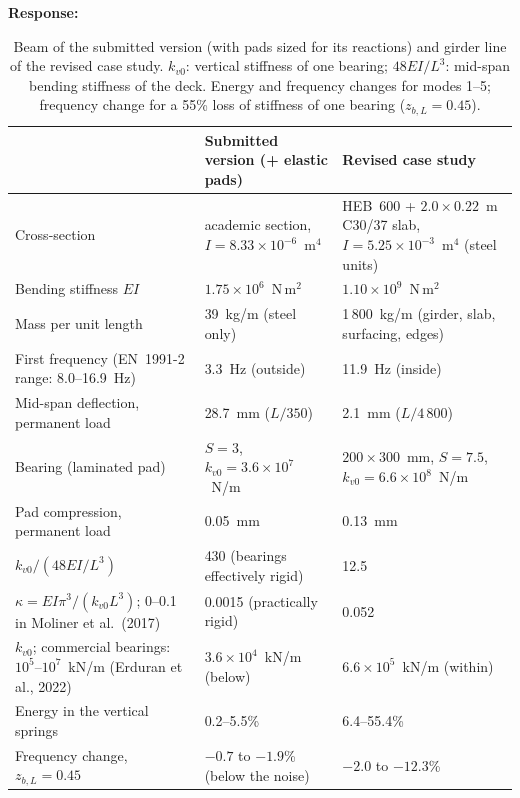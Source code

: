 \documentclass[11pt]{article}
\newenvironment{response}{\par\smallskip\noindent\color{resp}\textbf{Response:}\ }{\par}
\begin{document}
\begin{response}
\begin{table}[H]
\centering\small
\caption{Beam of the submitted version (with pads sized for its reactions) and girder line of the revised case study.
$k_{v0}$: vertical stiffness of one bearing; $48EI/L^3$: mid-span bending stiffness of the deck. Energy and frequency
changes for modes 1--5; frequency change for a 55\% loss of stiffness of one bearing ($z_{b,L}=0.45$).}
\label{tab:old_new}
\footnotesize
\begin{tabular}{p{5.0cm}p{4.6cm}p{5.0cm}}
\toprule
 & Submitted version (+ elastic pads) & Revised case study \\
\midrule
Cross-section & academic section, $I=8.33\times10^{-6}$~m$^4$ & HEB~600 + $2.0\times0.22$~m C30/37 slab,
$I=5.25\times10^{-3}$~m$^4$ (steel units) \\
Bending stiffness $EI$ & $1.75\times10^{6}$~N\,m$^2$ & $1.10\times10^{9}$~N\,m$^2$ \\
Mass per unit length & 39~kg/m (steel only) & 1\,800~kg/m (girder, slab, surfacing, edges) \\
First frequency (EN~1991-2 range: 8.0--16.9~Hz) & 3.3~Hz (outside) & 11.9~Hz (inside) \\
Mid-span deflection, permanent load & 28.7~mm ($L/350$) & 2.1~mm ($L/4\,800$) \\
Bearing (laminated pad) & $S=3$, $k_{v0}=3.6\times10^{7}$~N/m & $200\times300$~mm, $S=7.5$, $k_{v0}=6.6\times10^{8}$~N/m \\
Pad compression, permanent load & 0.05~mm & 0.13~mm \\
$k_{v0}/(48EI/L^3)$ & 430 (bearings effectively rigid) & 12.5 \\
$\kappa=EI\pi^3/(k_{v0}L^3)$; 0--0.1 in Moliner et al.\ (2017) & 0.0015 (practically rigid) & 0.052 \\
$k_{v0}$; commercial bearings: $10^{5}$--$10^{7}$~kN/m (Erduran et al., 2022) & $3.6\times10^{4}$~kN/m (below) &
$6.6\times10^{5}$~kN/m (within) \\
Energy in the vertical springs & 0.2--5.5\% & 6.4--55.4\% \\
Frequency change, $z_{b,L}=0.45$ & $-0.7$ to $-1.9$\% (below the noise) & $-2.0$ to $-12.3$\% \\
\bottomrule
\end{tabular}
\end{table}


\end{response}
\end{document}
